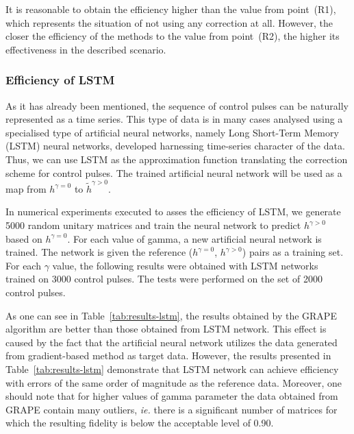 \documentclass[aps,pra,showkeys,showpacs,notitlepage,superscriptaddress]{revtex4-1}
\newcommand{\1}{{\rm 1\hspace{-0.9mm}l}}
\newcommand{\ie}{\emph{ie.}\xspace}
\newcommand{\NCP}{\ensuremath{h^{\gamma=0}}\xspace}
\newcommand{\DCP}{\ensuremath{h^{\gamma >0}}\xspace}
\newcommand{\nnDCP}{\ensuremath{\tilde{h}^{\gamma >0}}\xspace}
\begin{document}
It is reasonable to obtain the efficiency higher than the value from point~(R1), which represents the situation of not using any correction at all. However, the closer the efficiency of the methods to the value from point~(R2), the higher its effectiveness in the described scenario.




\subsubsection{Efficiency of LSTM}
As it has already been mentioned, the sequence of control pulses can be naturally represented as a time series. This type of data is in many cases analysed using a specialised type of artificial neural networks, namely Long Short-Term Memory (LSTM) neural networks, developed harnessing time-series character of the data. Thus, we can use LSTM as the 
approximation function translating the correction scheme for control pulses. 
The trained artificial neural network will be used as a map from \NCP to \nnDCP.


In numerical experiments executed to asses the efficiency of LSTM, we generate 5000 random unitary matrices and train the neural network to predict \DCP based on \NCP. For each value of gamma, a new artificial neural network is trained. The network is given the reference (\NCP, \DCP) pairs as a training set. For each $\gamma$ value, the following results were obtained with LSTM networks trained on 3000 control pulses. 
The tests were performed on the set of 2000 control pulses.  


As one can see in Table~\ref{tab:results-lstm}, the results obtained by the GRAPE algorithm are better than those obtained from LSTM network. This effect is caused by the fact that the artificial neural network utilizes the data generated from gradient-based method as target data. However, the results presented in Table~\ref{tab:results-lstm} demonstrate that LSTM network can achieve efficiency with errors of the same order of magnitude as the reference data. Moreover, one should note that for higher values of gamma parameter the data obtained from GRAPE contain many outliers, \ie there is a significant number of matrices for which the resulting fidelity is below the acceptable level of 0.90.
\end{document}

